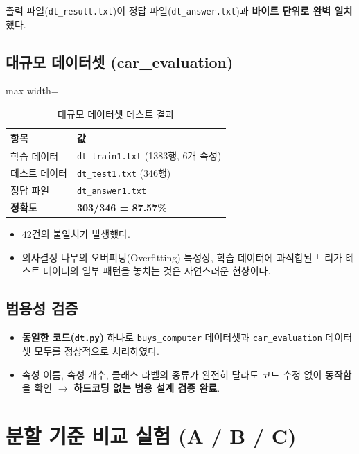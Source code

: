 \documentclass[12pt, a4paper]{article}
\begin{document}
출력 파일(\texttt{dt\_result.txt})이 정답 파일(\texttt{dt\_answer.txt})과 \textbf{바이트 단위로 완벽 일치}했다.

\subsection{대규모 데이터셋 (car\_evaluation)}

\begin{table}[h]
\centering
\begin{adjustbox}{max width=\textwidth}
\begin{tabular}{ll}
\toprule
\textbf{항목} & \textbf{값} \\
\midrule
학습 데이터   & \texttt{dt\_train1.txt} (1383행, 6개 속성) \\
테스트 데이터 & \texttt{dt\_test1.txt} (346행) \\
정답 파일     & \texttt{dt\_answer1.txt} \\
\textbf{정확도} & \textbf{303/346 = 87.57\%} \\
\bottomrule
\end{tabular}
\end{adjustbox}
\caption{대규모 데이터셋 테스트 결과}
\end{table}

\begin{itemize}
    \item 42건의 불일치가 발생했다.
    \item 의사결정 나무의 오버피팅(Overfitting) 특성상, 학습 데이터에 과적합된 트리가 테스트 데이터의 일부 패턴을 놓치는 것은 자연스러운 현상이다.
\end{itemize}

\subsection{범용성 검증}

\begin{itemize}
    \item \textbf{동일한 코드(\texttt{dt.py})} 하나로 \texttt{buys\_computer} 데이터셋과 \texttt{car\_evaluation} 데이터셋 모두를 정상적으로 처리하였다.
    \item 속성 이름, 속성 개수, 클래스 라벨의 종류가 완전히 달라도 코드 수정 없이 동작함을 확인 $\to$ \textbf{하드코딩 없는 범용 설계 검증 완료}.
\end{itemize}


\section{분할 기준 비교 실험 (A / B / C)}
\end{document}

